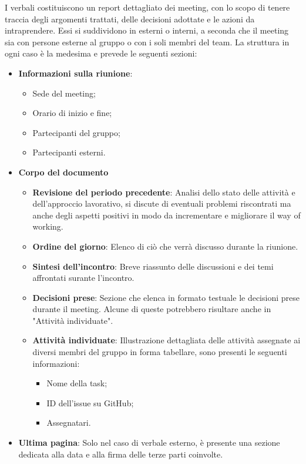 I verbali costituiscono un report dettagliato dei meeting, con lo scopo di tenere traccia degli argomenti trattati, delle decisioni adottate e le
azioni da intraprendere. Essi si suddividono in esterni o interni, a seconda che il meeting sia con persone esterne al gruppo o con i soli membri del team.
La struttura in ogni caso è la medesima e prevede le seguenti sezioni:
\begin{itemize}
	\item \textbf{Informazioni sulla riunione}:
	      \begin{itemize}
		      \item Sede del meeting;
		      \item Orario di inizio e fine;
		      \item Partecipanti del gruppo;
		      \item Partecipanti esterni.
	      \end{itemize}
	\item \textbf{Corpo del documento}
	      \begin{itemize}
		      \item \textbf{Revisione del periodo precedente}:
		            Analisi dello stato delle attività e dell'approccio lavorativo, si discute di eventuali problemi riscontrati
		            ma anche degli aspetti positivi in modo da incrementare e migliorare il way of working.
		      \item \textbf{Ordine del giorno}:
		            Elenco di ciò che verrà discusso durante la riunione.
		      \item \textbf{Sintesi dell'incontro}:
		            Breve riassunto delle discussioni e dei temi affrontati surante l'incontro.
		      \item \textbf{Decisioni prese}:
		            Sezione che elenca in formato testuale le decisioni prese durante il meeting. Alcune di queste potrebbero risultare anche in "Attività individuate".
		      \item \textbf{Attività individuate}:
		            Illustrazione dettagliata delle attività assegnate ai diversi membri del gruppo in forma tabellare, sono presenti le seguenti informazioni:
		            \begin{itemize}
			            \item Nome della task;
			            \item ID dell'issue su GitHub;
			            \item Assegnatari.
		            \end{itemize}
	      \end{itemize}
	\item \textbf{Ultima pagina}:
	      Solo nel caso di verbale esterno, è presente una sezione dedicata alla data e alla firma delle terze parti coinvolte.
\end{itemize}

